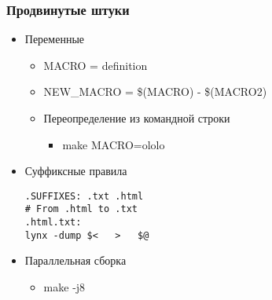 \documentclass[xetex,mathserif,serif]{beamer}
\begin{document}
    \begin{frame}[fragile]
        \frametitle{Продвинутые штуки}
        \begin{itemize}
            \item Переменные
            \begin{itemize}
                \item MACRO = definition
                \item NEW\_MACRO = \$(MACRO) - \$(MACRO2)
                \item Переопределение из командной строки
                \begin{itemize}
                    \item make MACRO=ololo
                \end{itemize}
            \end{itemize}
            \item Суффиксные правила
            \begin{footnotesize}
                \begin{verbatim}
.SUFFIXES: .txt .html
# From .html to .txt
.html.txt:
lynx -dump $<   >   $@
                \end{verbatim}
            \end{footnotesize}
            \item Параллельная сборка
            \begin{itemize}
                \item make -j8
            \end{itemize}
        \end{itemize}
    \end{frame}
\end{document}
